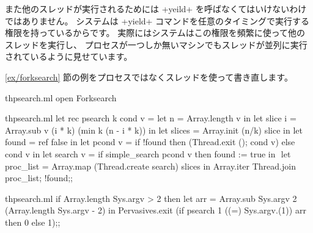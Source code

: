 また他のスレッドが実行されるためには \ml+yeild+ を呼ばなくてはいけないわけではありません。
システムは \ml+yield+ コマンドを任意のタイミングで実行する権限を持っているからです。
実際にはシステムはこの権限を頻繁に使って他のスレッドを実行し、
プロセスが一つしか無いマシンでもスレッドが並列に実行されているように見せています。

\begin{example}
\ref{ex/forksearch} 節の例をプロセスではなくスレッドを使って書き直します。
\begin{codefile}{thpsearch.ml}
open Forksearch
\end{codefile}
%
\begin{listingcodefile}[style=numbers]{thpsearch.ml}
let rec psearch k cond v =
  let n = Array.length v in
  let slice i = Array.sub v (i * k) (min k (n - i * k)) in
  let slices = Array.init (n/k) slice in
  let found = ref false in
  let pcond v = if !found then (Thread.exit (); cond v) else cond v in
  let search v = if simple_search pcond v then found := true in $\label{prog:search}$
  let proc_list = Array.map (Thread.create search) slices in
  Array.iter Thread.join proc_list;
  !found;;
\end{listingcodefile}
%
\begin{codefile}{thpsearch.ml}
if Array.length Sys.argv > 2 then
let arr = Array.sub Sys.argv 2 (Array.length Sys.argv - 2) in
Pervasives.exit (if psearch 1 ((=) Sys.argv.(1)) arr then  0 else 1);;
\end{codefile}
%

\end{example}
